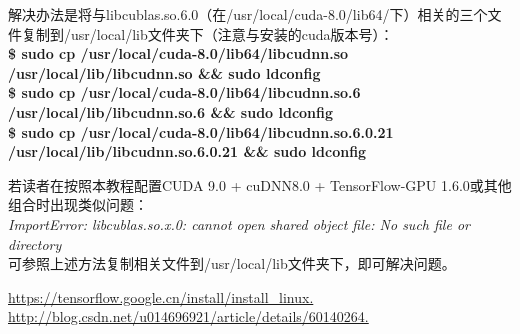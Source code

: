 \documentclass[11pt,a4paper]{ctexart}
\begin{document}
{\heiti  \color{green}解决办法是将与libcublas.so.6.0（在/usr/local/cuda-8.0/lib64/下）相关的三个文件复制到/usr/local/lib文件夹下（注意与安装的cuda版本号）}：\\
{\textbf {
\$ sudo cp /usr/local/cuda-8.0/lib64/libcudnn.so /usr/local/lib/libcudnn.so \&\& sudo ldconfig\\
\$ sudo cp /usr/local/cuda-8.0/lib64/libcudnn.so.6 /usr/local/lib/libcudnn.so.6 \&\& sudo ldconfig\\
\$ sudo cp /usr/local/cuda-8.0/lib64/libcudnn.so.6.0.21 /usr/local/lib/libcudnn.so.6.0.21 \&\& sudo ldconfig
}}


若读者在按照本教程配置CUDA 9.0 + cuDNN8.0 + TensorFlow-GPU 1.6.0或其他组合时出现类似问题：\\
{\emph{
ImportError: libcublas.so.{\color{red}x}.0: cannot open shared object file: No such file or directory
}}\\
{ \color{red} \heiti 可参照上述方法复制相关文件到/usr/local/lib文件夹下}，即可解决问题。



\begin{thebibliography}{99}  
 \url{https://tensorflow.google.cn/install/install_linux.  }
 \url{http://blog.csdn.net/u014696921/article/details/60140264.  }
\end{thebibliography}  
\end{document}
